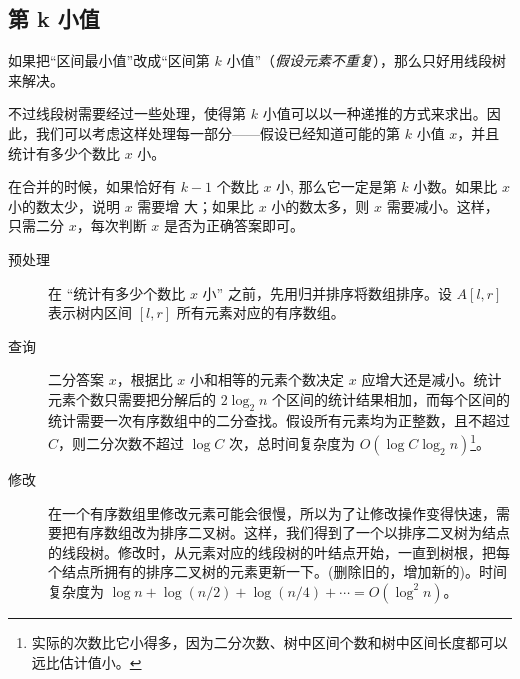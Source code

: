 \subsection{第 k 小值}
	如果把“区间最小值”改成“区间第 $k$ 小值”（\emph{假设元素不重复}），那么只好用线段树来解决。
	
	不过线段树需要经过一些处理，使得第 $k$ 小值可以以一种递推的方式来求出。因此，我们可以考虑这样处理每一部分------假设已经知道可能的第 $k$ 小值 $x$，并且统计有多少个数比 $x$ 小。
	
	在合并的时候，如果恰好有 $k−1$ 个数比 $x$ 小, 那么它一定是第 $k$ 小数。如果比 $x$ 小的数太少，说明 $x$ 需要增
	大；如果比 $x$ 小的数太多，则 $x$ 需要减小。这样，只需二分 $x$，每次判断 $x$ 是否为正确答案即可。
	
	\begin{description}
		\item[预处理] 在 “统计有多少个数比 $x$ 小” 之前，先用归并排序将数组排序。设 $A[l,r]$ 表示树内区间 $[l,r]$ 所有元素对应的有序数组。
		\item[查询] 二分答案 $x$，根据比 $x$ 小和相等的元素个数决定 $x$ 应增大还是减小。统计元素个数只需要把分解后的 $2\log _{2}n$ 个区间的统计结果相加，而每个区间的统计需要一次有序数组中的二分查找。假设所有元素均为正整数，且不超过 $C$，则二分次数不超过 $\log C$ 次，总时间复杂度为 $O(\log C\log _{2}n)$\footnote{实际的次数比它小得多，因为二分次数、树中区间个数和树中区间长度都可以远比估计值小。}。
		\item[修改] 在一个有序数组里修改元素可能会很慢，所以为了让修改操作变得快速，需要把有序数组改为排序二叉树。这样，我们得到了一个以排序二叉树为结点的线段树。修改时，从元素对应的线段树的叶结点开始，一直到树根，把每个结点所拥有的排序二叉树的元素更新一下。(删除旧的，增加新的)。时间复杂度为 $\log n+\log(n/2)+\log(n/4)+\cdots=O(\log^2 n)$。
	\end{description}